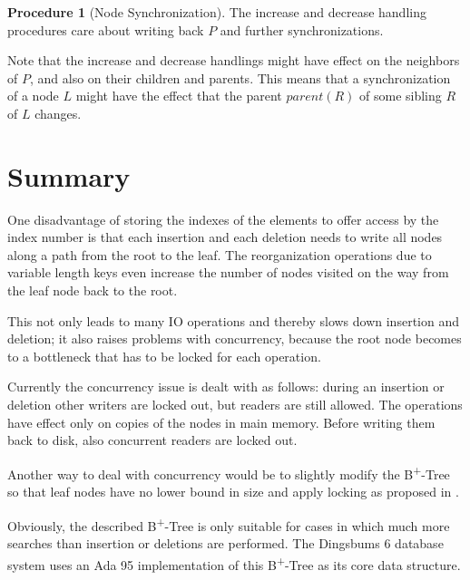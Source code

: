 \documentclass[a4paper, 8pt]{scrartcl}
\theoremstyle{plain}
\theoremstyle{definition}
\newtheorem{proc}[thm]{Procedure}
\theoremstyle{remark}
\newcommand \BTree { B\textsuperscript{+}-Tree }
\begin{document}
\begin{multicols}{2}
\begin{proc}[Node Synchronization]
The increase and decrease handling procedures care about writing back $P$
and further synchronizations.

Note that the increase and decrease handlings might have effect on the
neighbors of $P$, and also on their children and parents.
This means that a synchronization of a node $L$ might have the effect that
the parent $parent(R)$ of some sibling $R$ of $L$ changes.
\end{proc}



\section{Summary}

One disadvantage of storing the indexes of the elements to offer access by
the index number is that each insertion and each deletion needs to write
all nodes along a path from the root to the leaf.
The reorganization operations due to variable length keys even increase the 
number of nodes visited on the way from the leaf node back to the root.

This not only leads to many IO operations and thereby slows down insertion and
deletion; it also raises problems with concurrency, because the root node
becomes to a bottleneck that has to be locked for each operation.

Currently the concurrency issue is dealt with as follows: during an insertion or
deletion other writers are locked out, but readers are still allowed. The
operations have effect only on copies of the nodes in main memory. Before 
writing them back to disk, also concurrent readers are locked out.

Another way to deal with concurrency would be to slightly modify the \BTree so
that leaf nodes have no lower bound in size and apply locking as proposed in
\cite{Lehman}.

Obviously, the described \BTree is only suitable for cases in which much more
searches than insertion or deletions are performed.
The Dingsbums 6 database system uses an Ada 95 implementation of this
\BTree as its core data structure.


\end{multicols}
\end{document}
